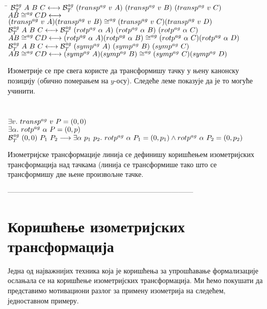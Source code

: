 {\tt
\begin{tabbing}
\hspace{5mm}\=\kill
$ \mathcal{B}_T^{\mathit{ag}}\ A\ B\ C \longleftrightarrow \mathcal{B}_T^{\mathit{ag}}\ (transp^{ag}\ v\ A)\ (transp^{ag}\ v\ B)\ (transp^{ag}\ v\ C)$\\
$AB \cong^{ag} CD \longleftrightarrow$\\
\> $(transp^{ag}\ v\ A)(transp^{ag}\ v\ B) \cong^{ag} (transp^{ag}\ v\ C)(transp^{ag}\ v\ D)$\\
$\mathcal{B}_T^{\mathit{ag}}\ A\ B\ C \longleftrightarrow \mathcal{B}_T^{\mathit{ag}}\ (rotp^{ag}\ \alpha\ A)\ (rotp^{ag}\ \alpha\ B)\ (rotp^{ag}\ \alpha\ C)$\\
$AB \cong^{ag} CD \longleftrightarrow
   (rotp^{ag}\ \alpha\ A)(rotp^{ag}\ \alpha\ B) \cong^{ag} (rotp^{ag}\ \alpha\ C)(rotp^{ag}\ \alpha\ D)$\\
$\mathcal{B}_T^{\mathit{ag}}\ A\ B\ C \longleftrightarrow \mathcal{B}_T^{\mathit{ag}}\ (symp^{ag}\ A)\ (symp^{ag}\ B)\ (symp^{ag}\ C)$\\
$AB \cong^{ag} CD \longleftrightarrow
   (symp^{ag}\ A)(symp^{ag}\ B) \cong^{ag} (symp^{ag}\ C)(symp^{ag}\ D)$
\end{tabbing}
}

Изометрије се пре свега користе да трансформишу тачку у њену канонску
позицију (обично померањем на $y$-осу).  Следеће леме показује да је
то могуће учинити.

{\tt
\begin{tabbing}
$\exists v.\ transp^{ag}\ v\ P = (0, 0)$\\
$\exists \alpha.\ rotp^{ag}\ \alpha\ P = (0, p)$\\
$\mathcal{B}_T^{\mathit{ag}}\ (0, 0)\ P_1\ P_2 \longrightarrow \exists \alpha\ p_1\
p_2.\ rotp^{ag}\ \alpha\ P_1 = (0, p_1) \wedge rotp^{ag}\ \alpha\ P_2
= (0, p_2)$
\end{tabbing}
}

Изометријске трансформације линија се дефинишу коришћењем
изометријских трансформација над тачкама (линија се трансформише тако
што се трансформишу две њене произвољне тачке.

 ------------------------------------------------------------------------------
\section{Коришћење изометријских трансформација}
\label{sec:iso}
Једна од најважнијих техника која је коришћења за упрошћавање
формализације ослањала се на коришћење изометријских
трансформација. Ми ћемо покушати да представимо мотивациони разлог за
примену изометрија на следећем, једноставном примеру.

